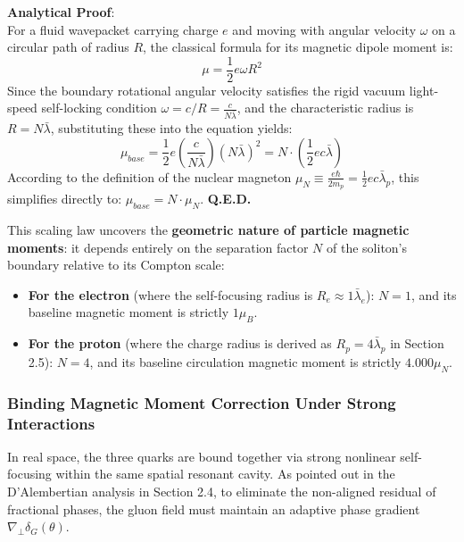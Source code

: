 \documentclass[12pt, a4paper]{article}
\begin{document}
\textbf{Analytical Proof}: \\
For a fluid wavepacket carrying charge $e$ and moving with angular velocity $\omega$ on a circular path of radius $R$, the classical formula for its magnetic dipole moment is:
\begin{equation}
\mu = \frac{1}{2} e \omega R^2 \label{eq:classical_mu}
\end{equation}
Since the boundary rotational angular velocity satisfies the rigid vacuum light-speed self-locking condition $\omega = c/R = \frac{c}{N\bar{\lambda}}$, and the characteristic radius is $R = N\bar{\lambda}$, substituting these into the equation yields:
\begin{equation}
\mu_{base} = \frac{1}{2} e \left( \frac{c}{N\bar{\lambda}} \right) (N\bar{\lambda})^2 = N \cdot \left( \frac{1}{2} e c \bar{\lambda} \right) \label{eq:proof_step}
\end{equation}
According to the definition of the nuclear magneton $\mu_{N} \equiv \frac{e\hbar}{2m_p} = \frac{1}{2} e c \bar{\lambda}_p$, this simplifies directly to: $\mu_{base} = N \cdot \mu_N$. \textbf{Q.E.D.}

This scaling law uncovers the \textbf{geometric nature of particle magnetic moments}: it depends entirely on the separation factor $N$ of the soliton's boundary relative to its Compton scale:
\begin{itemize}
    \item \textbf{For the electron} (where the self-focusing radius is $R_e \approx 1\bar{\lambda}_e$): $N=1$, and its baseline magnetic moment is strictly $1 \mu_B$.
    \item \textbf{For the proton} (where the charge radius is derived as $R_p = 4\bar{\lambda}_p$ in Section 2.5): $N=4$, and its baseline circulation magnetic moment is strictly \textbf{$4.000 \mu_N$}.
\end{itemize}

\subsubsection{Binding Magnetic Moment Correction Under Strong Interactions}

In real space, the three quarks are bound together via strong nonlinear self-focusing within the same spatial resonant cavity. As pointed out in the D'Alembertian analysis in Section 2.4, to eliminate the non-aligned residual of fractional phases, the gluon field must maintain an adaptive phase gradient $\nabla_\perp \delta_G(\theta)$.
\end{document}
